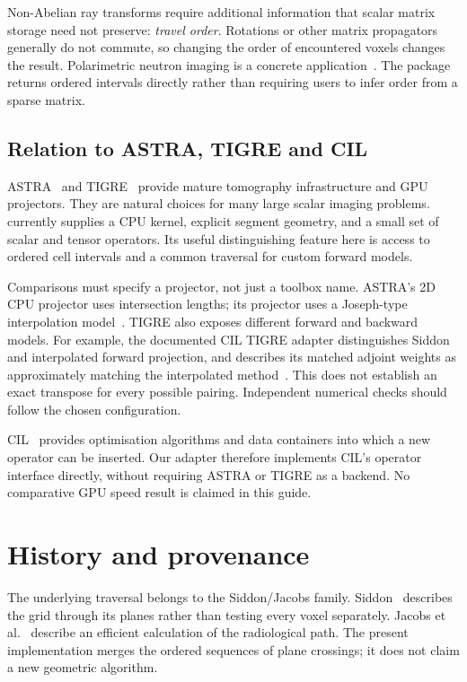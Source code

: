 \documentclass[11pt,a4paper]{article}
\newcommand{\code}[1]{\texttt{\detokenize{#1}}}
\begin{document}
Non-Abelian ray transforms require additional information that scalar
matrix storage need not preserve: \emph{travel order}. Rotations or other
matrix propagators generally do not commute, so changing the order of
encountered voxels changes the result. Polarimetric neutron imaging is a
concrete application~\cite{desai2020,sales2018}. The package returns ordered
intervals directly rather than requiring users to infer order from a sparse
matrix.

\subsection{Relation to ASTRA, TIGRE and CIL}
ASTRA~\cite{astra2016} and TIGRE~\cite{tigre2016} provide mature tomography
infrastructure and GPU projectors. They are natural choices for many large
scalar imaging problems. \code{jacobsrays} currently supplies a CPU kernel,
explicit segment geometry, and a small set of scalar and tensor operators.
Its useful distinguishing feature here is access to ordered cell intervals
and a common traversal for custom forward models.

Comparisons must specify a projector, not just a toolbox name. ASTRA's 2D
CPU \code{line} projector uses intersection lengths; its \code{linear}
projector uses a Joseph-type interpolation model~\cite{astraprojectors}.
TIGRE also exposes different forward and backward models. For example, the
documented CIL TIGRE adapter distinguishes Siddon and interpolated forward
projection, and describes its matched adjoint weights as approximately
matching the interpolated method~\cite{ciltigre}. This does not establish
an exact transpose for every possible pairing. Independent numerical
checks should follow the chosen configuration.

CIL~\cite{cil2021} provides optimisation algorithms and data containers
into which a new operator can be inserted. Our adapter therefore implements
CIL's operator interface directly, without requiring ASTRA or TIGRE as a
backend. No comparative GPU speed result is claimed in this guide.

\section{History and provenance}
\label{sec:history}
The underlying traversal belongs to the Siddon/Jacobs family.
Siddon~\cite{siddon1985} describes the grid through its planes rather than
testing every voxel separately. Jacobs et al.~\cite{jacobs1998} describe
an efficient calculation of the radiological path. The present implementation
merges the ordered sequences of plane crossings; it does not claim a new
geometric algorithm.
\end{document}
